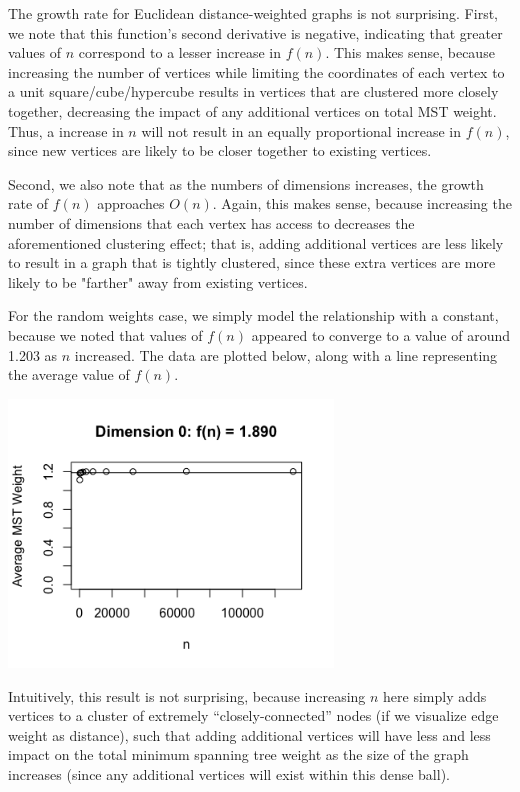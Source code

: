 \documentclass[a4paper]{article}
\begin{document}
The growth rate for Euclidean distance-weighted graphs is not surprising. First, we note that this function's second derivative is negative, indicating that greater values of $n$ correspond to a lesser increase in $f(n)$. This makes sense, because increasing the number of vertices while limiting the coordinates of each vertex to a unit square/cube/hypercube results in vertices that are clustered more closely together, decreasing the impact of any additional vertices on total MST weight. Thus, a increase in $n$ will not result in an equally proportional increase in $f(n)$, since new vertices are likely to be closer together to existing vertices.

Second, we also note that as the numbers of dimensions increases, the growth rate of $f(n)$ approaches $O(n)$. Again, this makes sense, because increasing the number of dimensions that each vertex has access to decreases the aforementioned clustering effect; that is, adding additional vertices are less likely to result in a graph that is tightly clustered, since these extra vertices are more likely to be "farther" away from existing vertices.

For the random weights case, we simply model the relationship with a constant, because we noted that values of $f(n)$ appeared to converge to a value of around 1.203 as $n$ increased. The data are plotted below, along with a line representing the average value of $f(n)$.

\begin{center}
	\includegraphics[width=3.4in]{dim0plot}
\end{center}

Intuitively, this result is not surprising, because increasing $n$ here simply adds vertices to a cluster of extremely ``closely-connected'' nodes (if we visualize edge weight as distance), such that adding additional vertices will have less and less impact on the total minimum spanning tree weight as the size of the graph increases (since any additional vertices will exist within this dense ball).
\end{document}
